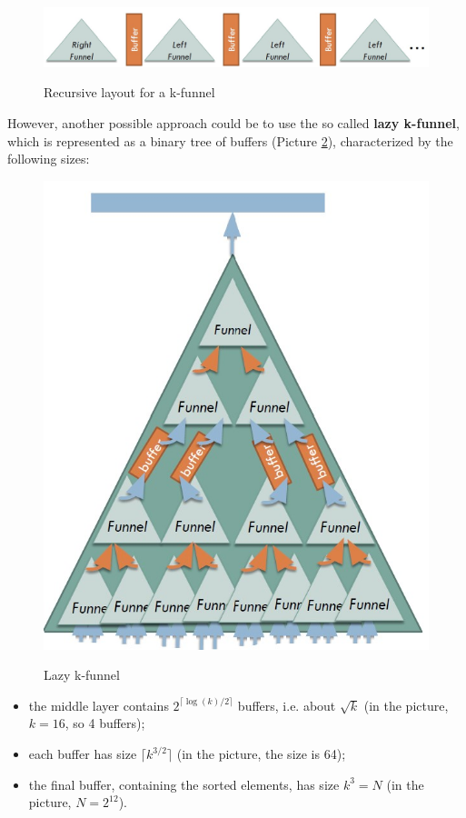 \begin{figure}[h!]
		\centering
		\includegraphics[scale = 0.8]{img/recursive_layout_funnels.jpg}
        \label{funnel_recursive}
        \caption{Recursive layout for a k-funnel}
\end{figure}

However, another possible approach could be to use the so called \textbf{lazy k-funnel}, which is represented as a binary tree of buffers (Picture \ref{lazy_kfunnel}), characterized by the following sizes:

\begin{figure}[h!]
		\centering
		\includegraphics[scale = 0.8]{img/lazy_k_funnel.jpg}
        \label{lazy_kfunnel}
        \caption{Lazy k-funnel}
\end{figure}

\begin{itemize}
    \item the middle layer contains $2 ^ {\lceil \log(k)/2 \rceil}$ buffers, i.e. about $\sqrt{k}$ (in the picture, $k = 16$, so 4 buffers);
    \item each buffer has size $\lceil k^{3/2} \rceil$ (in the picture, the size is 64);
    \item the final buffer, containing the sorted elements, has size $k^3 = N$ (in the picture, $N = 2^{12}$).
\end{itemize}

